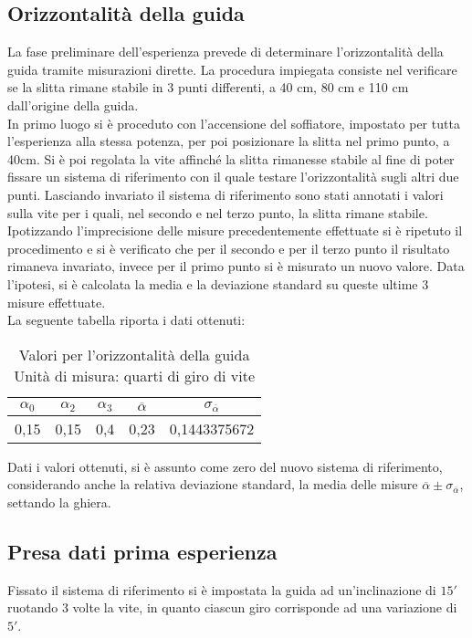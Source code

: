 \documentclass[a4paper,11pt,oneside]{article}
\begin{document}
\subsection{Orizzontalità della guida}
La fase preliminare dell'esperienza prevede di determinare l'orizzontalità della guida tramite misurazioni dirette. La procedura impiegata consiste nel verificare se la slitta rimane stabile in 3 punti differenti, a 40 cm, 80 cm e 110 cm dall'origine della guida.\\
In primo luogo si è proceduto con l'accensione del soffiatore, impostato per tutta l'esperienza alla stessa potenza, per poi posizionare la slitta nel primo punto, a 40cm. Si è poi regolata la vite affinché la slitta rimanesse stabile al fine di poter fissare un sistema di riferimento con il quale testare l'orizzontalità sugli altri due punti. Lasciando invariato il sistema di riferimento sono stati annotati i valori sulla vite per i quali, nel secondo  e nel terzo punto, la slitta rimane stabile.\\
Ipotizzando l'imprecisione delle misure precedentemente effettuate si è ripetuto il procedimento e si è verificato che per il secondo e per il terzo punto il risultato rimaneva invariato, invece per il primo punto si è misurato un nuovo valore. Data l'ipotesi, si è calcolata la media e la deviazione standard su queste ultime 3 misure effettuate.\\
La seguente tabella riporta i dati ottenuti:

\begin{table}[h]
    \centering
        \caption{Valori per l'orizzontalità della guida \\ Unità di misura: quarti di giro di vite}
\begin{tabular}{ccc|cc}
    \toprule
    $\alpha_{0}$&$\alpha_{2}$&$\alpha_{3}$&$\overline{\alpha}$&$\sigma_{\overline{\alpha}}$\\
    \midrule
0,15&0,15&0,4&0,23&0,1443375672 \\
    \bottomrule
    \end{tabular}
    \label{tab:guida_orizzontale}
\end{table}

Dati i valori ottenuti, si è assunto come zero del nuovo sistema di riferimento, considerando anche la relativa deviazione standard, la media delle misure $\overline{\alpha} \pm \sigma_{\overline{\alpha}}$, settando la ghiera.\\


\subsection{Presa dati prima esperienza}
Fissato il sistema di riferimento si è impostata la guida ad un'inclinazione di $15'$ ruotando 3 volte la vite, in quanto ciascun giro corrisponde ad una variazione  di $5'$.\\
\end{document}
